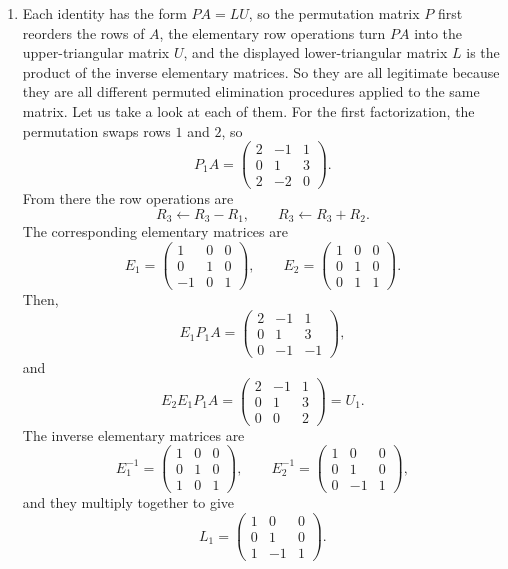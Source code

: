 \documentclass[10pt]{extarticle}
\begin{document}
\begin{enumerate}[label=(\alph*)]
\item Each identity has the form $PA=LU$, so the permutation matrix $P$ first reorders the rows of $A$, the elementary row operations turn $PA$ into the upper-triangular matrix $U$, and the displayed lower-triangular matrix $L$ is the product of the inverse elementary matrices. So they are all legitimate because they are all different permuted elimination procedures applied to the same matrix. Let us take a look at each of them. For the first factorization, the permutation swaps rows $1$ and $2$, so
\[
P_1A=
\begin{pmatrix}
2 & -1 & 1\\
0 & 1 & 3\\
2 & -2 & 0
\end{pmatrix}.
\]
From there the row operations are
\[
R_3\leftarrow R_3-R_1,\qquad R_3\leftarrow R_3+R_2.
\]
The corresponding elementary matrices are
\[
E_1=
\begin{pmatrix}
1 & 0 & 0\\
0 & 1 & 0\\
-1 & 0 & 1
\end{pmatrix},
\qquad
E_2=
\begin{pmatrix}
1 & 0 & 0\\
0 & 1 & 0\\
0 & 1 & 1
\end{pmatrix}.
\]
Then,
\[
E_1P_1A=
\begin{pmatrix}
2 & -1 & 1\\
0 & 1 & 3\\
0 & -1 & -1
\end{pmatrix},
\]
and
\[
E_2E_1P_1A=
\begin{pmatrix}
2 & -1 & 1\\
0 & 1 & 3\\
0 & 0 & 2
\end{pmatrix}
=U_1.
\]
The inverse elementary matrices are
\[
E_1^{-1}=
\begin{pmatrix}
1 & 0 & 0\\
0 & 1 & 0\\
1 & 0 & 1
\end{pmatrix},
\qquad
E_2^{-1}=
\begin{pmatrix}
1 & 0 & 0\\
0 & 1 & 0\\
0 & -1 & 1
\end{pmatrix},
\]
and they multiply together to give
\[
L_1=
\begin{pmatrix}
1 & 0 & 0\\
0 & 1 & 0\\
1 & -1 & 1
\end{pmatrix}.
\]


\end{enumerate}
\end{document}
